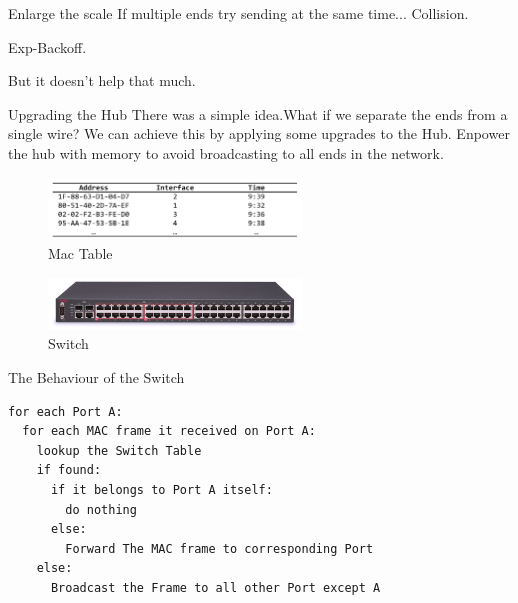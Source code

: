 \documentclass[UTF8]{ctexbeamer}
\begin{document}
\begin{frame}{Enlarge the scale}
    If multiple ends try sending at the same time...
    Collision.\pause
    
    Exp-Backoff.\pause
    
    But it doesn't help that much.
    
\end{frame}

\begin{frame}{Upgrading the Hub}
    There was a simple idea.What if we separate the ends from a single wire?
    We can achieve this by applying some upgrades to the Hub.
    Enpower the hub with memory to avoid broadcasting to all ends in the network.
    \begin{figure}
        \centering
        \includegraphics[width=0.6\textwidth]{mac-table.png}
        \caption{Mac Table}
    \end{figure}
        \begin{figure}
        \centering
        \includegraphics[width=0.6\textwidth]{2550T-PWR-Front.jpg}
        \caption{Switch}
    \end{figure}

\end{frame}

\begin{frame}[fragile]{The Behaviour of the Switch}
\begin{verbatim}
for each Port A:
  for each MAC frame it received on Port A:
    lookup the Switch Table
    if found:
      if it belongs to Port A itself:
        do nothing 
      else:
        Forward The MAC frame to corresponding Port
    else:
      Broadcast the Frame to all other Port except A
\end{verbatim}
\end{frame}
\end{document}
